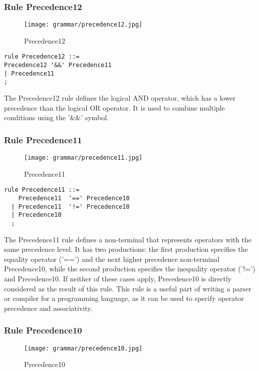 \subsubsection*{Rule Precedence12}

\begin{figure}[!ht]
\centering
\texttt{[image: grammar/precedence12.jpg]}
\caption{Precedence12}
\end{figure}

\begin{lstlisting}
rule Precedence12 ::=
Precedence12 '&&' Precedence11
| Precedence11
;
\end{lstlisting}

The Precedence12 rule defines the logical AND operator, which has a lower precedence than the logical OR operator. It is used to combine multiple conditions using the '\&\&' symbol.

\subsubsection*{Rule Precedence11}

\begin{figure}[!ht]
\centering
\texttt{[image: grammar/precedence11.jpg]}
\caption{Precedence11}
\end{figure}

\begin{lstlisting}
rule Precedence11 ::=
    Precedence11  '==' Precedence10 
  | Precedence11  '!=' Precedence10 
  | Precedence10 
  ;
\end{lstlisting}

The Precedence11 rule defines a non-terminal that represents operators with the same precedence level. It has two productions: the first production specifies the equality operator ('==') and the next higher precedence non-terminal Precedence10, while the second production specifies the inequality operator ('!=') and Precedence10. If neither of these cases apply, Precedence10 is directly considered as the result of this rule. This rule is a useful part of writing a parser or compiler for a programming language, as it can be used to specify operator precedence and associativity.

\subsubsection*{Rule Precedence10}

\begin{figure}[!ht]
\centering
\texttt{[image: grammar/precedence10.jpg]}
\caption{Precedence10}
\end{figure}


